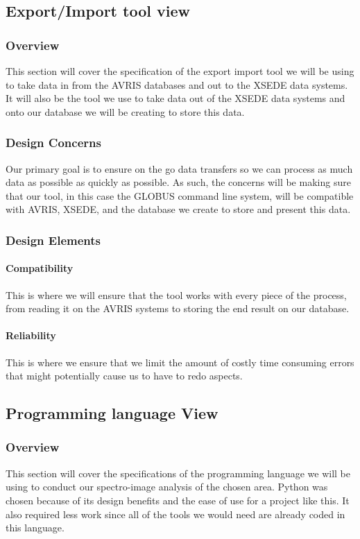 \documentclass[10pt,draftclsnofoot,onecolumn,journal,compsoc]{IEEEtran}
\begin{document}
\subsection{Export/Import tool view}
\subsubsection{Overview}
This section will cover the specification of the export import tool we will be using to take data in from the AVRIS databases and out to the XSEDE data systems. It will also be the tool we use to take data out of the XSEDE data systems and onto our database we will be creating to store this data.
\subsubsection{Design Concerns}
Our primary goal is to ensure on the go data transfers so we can process as much data as possible as quickly as possible. As such, the concerns will be making sure that our tool, in this case the GLOBUS command line system, will be compatible with AVRIS, XSEDE, and the database we create to store and present this data.
\subsubsection{Design Elements}
\paragraph{Compatibility}
This is where we will ensure that the tool works with every piece of the process, from reading it on the AVRIS systems to storing the end result on our database.
\paragraph{Reliability}
This is where we ensure that we limit the amount of costly time consuming errors that might potentially cause us to have to redo aspects.

\subsection{Programming language View}
\subsubsection{Overview}
This section will cover the specifications of the programming language we will be using to conduct our spectro-image analysis of the chosen area. Python was chosen because of its design benefits and the ease of use for a project like this. It also required less work since all of the tools we would need are already coded in this language.
\end{document}
